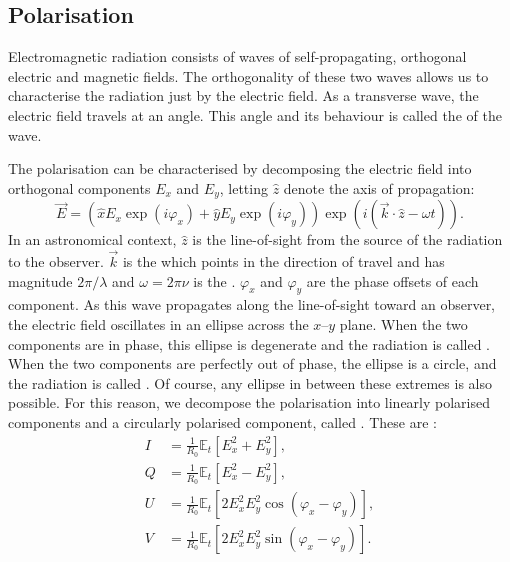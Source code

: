     \subsection{Polarisation}
    \label{sec:polarisation}

        Electromagnetic radiation consists of waves of self-propagating, orthogonal electric and magnetic fields. The orthogonality of these two waves allows us to characterise the radiation just by the electric field. As a transverse wave, the electric field travels at an angle. This angle and its behaviour is called the  of the wave.

        The polarisation can be characterised by decomposing the electric field into orthogonal components $E_x$ and $E_y$, letting $\hat z$ denote the axis of propagation:
        \begin{equation}
            \vec E = (\hat x E_x \exp(i \varphi_x) + \hat y E_y \exp(i \varphi_y)) \exp(i (\vec k \cdot \hat z - \omega t)).
        \end{equation}
        In an astronomical context, $\hat z$ is the line-of-sight from the source of the radiation to the observer. $\vec k$ is the  which points in the direction of travel and has magnitude $2\pi/\lambda$ and $\omega = 2\pi\nu$ is the . $\varphi_x$ and $\varphi_y$ are the phase offsets of each component. As this wave propagates along the line-of-sight toward an observer, the electric field oscillates in an ellipse across the $x$--$y$ plane. When the two components are in phase, this ellipse is degenerate and the radiation is called . When the two components are perfectly out of phase, the ellipse is a circle, and the radiation is called . Of course, any ellipse in between these extremes is also possible. For this reason, we decompose the polarisation into linearly polarised components and a circularly polarised component, called . These are \citep{condon_essential_2016}:
        \begin{align}
            \label{eq:stokes-i}
            I &= \frac{1}{R_0} \mathbb E_t[E_x^2 + E_y^2],\\
            \label{eq:stokes-q}
            Q &= \frac{1}{R_0} \mathbb E_t[E_x^2 - E_y^2],\\
            \label{eq:stokes-u}
            U &= \frac{1}{R_0} \mathbb E_t[2 E_x^2 E_y^2 \cos (\varphi_x - \varphi_y)],\\
            \label{eq:stokes-v}
            V &= \frac{1}{R_0} \mathbb E_t[2 E_x^2 E_y^2 \sin (\varphi_x - \varphi_y)].
        \end{align}
